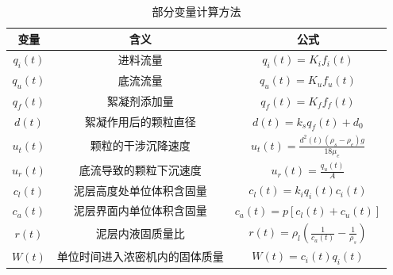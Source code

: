 \begin{table}[htb]
  \centering
\caption{部分变量计算方法}
\label{tab:variable_calculation}
\begin{tabular}{ccc}
\toprule 变量        & 含义              & 公式
\\ \midrule
$q_i(t)$  & 进料流量            & $q _ { i } ( t ) = K _ { i } f _ { i } ( t )$                                                                \\
$q_u(t)$  & 底流流量            & $q _ { u } ( t ) = K _ { u } f _ { u } ( t )$                                                                \\
$q_f(t)$  & 絮凝剂添加量          & $q _ { f } ( t ) = K _ { f } f _ { f } ( t )$                                                                \\
$d(t)$    & 絮凝作用后的颗粒直径      & $d ( t ) = k _ { s } q _ { f } ( t ) + d _ { 0 }$                                                            \\
$u_t(t)$  & 颗粒的干涉沉降速度       & $u _ { t} ( t ) = \frac { d ^ { 2 } ( t ) \left( \rho _ { s } - \rho _ { e } \right) g } { 18 \mu _ { e } }$ \\
$u_r(t)$  & 底流导致的颗粒下沉速度     & $u _ { r } ( t ) = \frac { q _ { u } ( t ) } { A  }$                                                         \\
$c_l(t)$  & 泥层高度处单位体积含固量    & $c _ { l } ( t ) = k _ { i } q _ { i } ( t ) c _ { i } ( t )$                                                \\
$c_a(t)$  & 泥层界面内单位体积含固量    & $c _ { a } ( t ) = p \left[ c _ { l } ( t ) + c _ { u } ( t ) \right]$                                       \\
$r(t)$  & 泥层内液固质量比    & $r(t)=\rho_{l}\left(\frac{1}{c_ a(t)}-\frac{1}{\rho_s}\right)$                                        \\
$W ( t )$ & 单位时间进入浓密机内的固体质量 & $W ( t ) = c _ { i } (
t ) q _ { i } ( t )$
\\ \bottomrule
\end{tabular}
\end{table}

